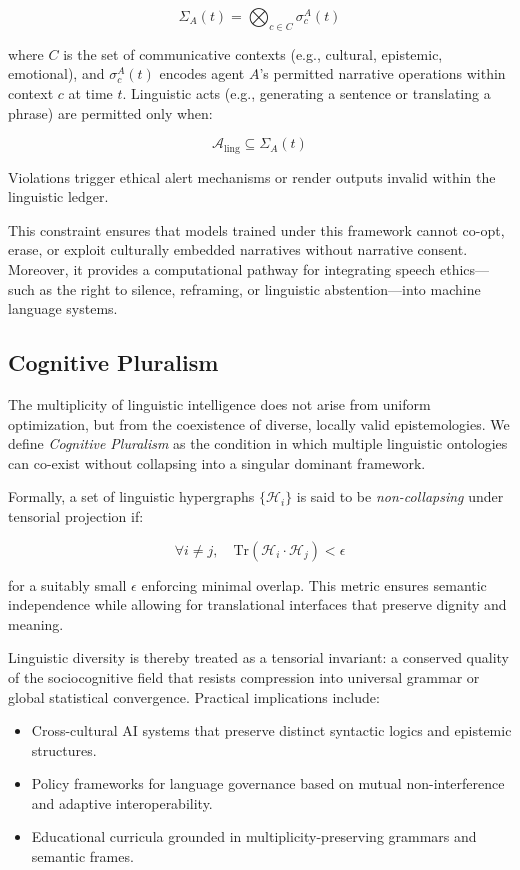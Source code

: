 \documentclass{article}
\theoremstyle{plain}
\theoremstyle{claimstyle}
\begin{document}
\[
\Sigma_A(t) = \bigotimes_{c \in C} \sigma_c^A(t)
\]

where $C$ is the set of communicative contexts (e.g., cultural, epistemic, emotional), and $\sigma_c^A(t)$ encodes agent $A$’s permitted narrative operations within context $c$ at time $t$. Linguistic acts (e.g., generating a sentence or translating a phrase) are permitted only when:

\[
\mathcal{A}_{\text{ling}} \subseteq \Sigma_A(t)
\]

Violations trigger ethical alert mechanisms or render outputs invalid within the linguistic ledger.

This constraint ensures that models trained under this framework cannot co-opt, erase, or exploit culturally embedded narratives without narrative consent. Moreover, it provides a computational pathway for integrating speech ethics—such as the right to silence, reframing, or linguistic abstention—into machine language systems.

\subsection{Cognitive Pluralism}

The multiplicity of linguistic intelligence does not arise from uniform optimization, but from the coexistence of diverse, locally valid epistemologies. We define \textit{Cognitive Pluralism} as the condition in which multiple linguistic ontologies can co-exist without collapsing into a singular dominant framework.

Formally, a set of linguistic hypergraphs $\{\mathcal{H}_i\}$ is said to be \textit{non-collapsing} under tensorial projection if:

\[
\forall i \neq j, \quad \text{Tr}(\mathcal{H}_i \cdot \mathcal{H}_j) < \epsilon
\]

for a suitably small $\epsilon$ enforcing minimal overlap. This metric ensures semantic independence while allowing for translational interfaces that preserve dignity and meaning.

Linguistic diversity is thereby treated as a tensorial invariant: a conserved quality of the sociocognitive field that resists compression into universal grammar or global statistical convergence. Practical implications include:

\begin{itemize}
    \item Cross-cultural AI systems that preserve distinct syntactic logics and epistemic structures.
    \item Policy frameworks for language governance based on mutual non-interference and adaptive interoperability.
    \item Educational curricula grounded in multiplicity-preserving grammars and semantic frames.
\end{itemize}
\end{document}
